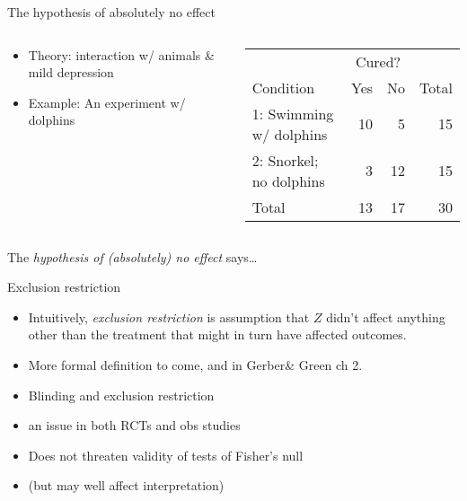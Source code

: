 \begin{frame}{The hypothesis of absolutely no effect}
  
\begin{columns}
\begin{column}{.3\linewidth}
      \begin{itemize}
      \item Theory: interaction w/ animals \& mild depression
      \item Example: An experiment w/ dolphins\footnotemark
      \end{itemize}
\end{column}
\begin{column}{.7\linewidth}
       \begin{center}
  \begin{tabular}{l|rr|r} \hline
        & \multicolumn{2}{c|}{Cured?} & \\
Condition &  Yes & No & Total \\ \hline
1: Swimming w/ dolphins & 10 & 5 & 15\\
2: Snorkel; no dolphins & 3 & 12 & 15\\ \hline
Total & 13 & 17 & 30 \\ \hline
\end{tabular}
      \end{center}
\end{column}
\end{columns}
\pause

The \textit{hypothesis of (absolutely) no effect} says\ldots

\end{frame}

\begin{frame}{Exclusion restriction}

  \begin{itemize}
  \item Intuitively, \textit{exclusion restriction} is assumption that $Z$ didn't affect anything other than the treatment that might in turn have affected outcomes.
  \item More formal definition to come, and in Gerber\& Green ch 2.
  \item Blinding and exclusion restriction
  \item an issue in both RCTs and obs studies
  \item<2-> Does not threaten validity of tests of Fisher's null
  \item<2-> (but may well affect interpretation) 
  \end{itemize}
  
\end{frame}

